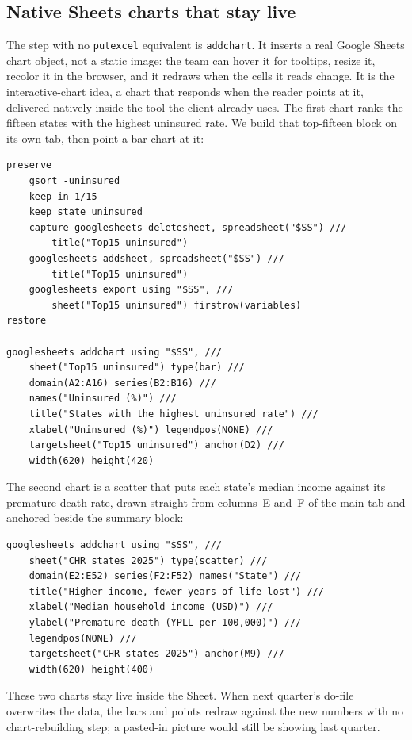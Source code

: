 \documentclass[
    a4paper,
    fontsize=10pt,
    twoside=true,
    numbers=noenddot,
]{kaobook}
\begin{document}
\subsection{Native Sheets charts that stay live}
The step with no \texttt{putexcel} equivalent is \texttt{addchart}. It inserts a real Google Sheets chart object, not a static image: the team can hover it for tooltips, resize it, recolor it in the browser, and it redraws when the cells it reads change. It is the interactive-chart idea, a chart that responds when the reader points at it, delivered natively inside the tool the client already uses. The first chart ranks the fifteen states with the highest uninsured rate. We build that top-fifteen block on its own tab, then point a bar chart at it:
\par
{\footnotesize
\begin{verbatim}
preserve
    gsort -uninsured
    keep in 1/15
    keep state uninsured
    capture googlesheets deletesheet, spreadsheet("$SS") ///
        title("Top15 uninsured")
    googlesheets addsheet, spreadsheet("$SS") ///
        title("Top15 uninsured")
    googlesheets export using "$SS", ///
        sheet("Top15 uninsured") firstrow(variables)
restore

googlesheets addchart using "$SS", ///
    sheet("Top15 uninsured") type(bar) ///
    domain(A2:A16) series(B2:B16) ///
    names("Uninsured (%)") ///
    title("States with the highest uninsured rate") ///
    xlabel("Uninsured (%)") legendpos(NONE) ///
    targetsheet("Top15 uninsured") anchor(D2) ///
    width(620) height(420)
\end{verbatim}
}
The second chart is a scatter that puts each state's median income against its premature-death rate, drawn straight from columns~E and~F of the main tab and anchored beside the summary block:
\par
{\footnotesize
\begin{verbatim}
googlesheets addchart using "$SS", ///
    sheet("CHR states 2025") type(scatter) ///
    domain(E2:E52) series(F2:F52) names("State") ///
    title("Higher income, fewer years of life lost") ///
    xlabel("Median household income (USD)") ///
    ylabel("Premature death (YPLL per 100,000)") ///
    legendpos(NONE) ///
    targetsheet("CHR states 2025") anchor(M9) ///
    width(620) height(400)
\end{verbatim}
}
These two charts stay live inside the Sheet. When next quarter's do-file overwrites the data, the bars and points redraw against the new numbers with no chart-rebuilding step; a pasted-in picture would still be showing last quarter.
\end{document}
